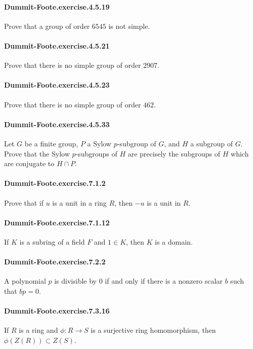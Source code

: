 \documentclass{article}
\begin{document}
\paragraph{Dummit-Foote.exercise.4.5.19} Prove that a group of order $6545$ is not simple.

\paragraph{Dummit-Foote.exercise.4.5.21} Prove that there is no simple group of order $2907$.

\paragraph{Dummit-Foote.exercise.4.5.23} Prove that there is no simple group of order $462$.

\paragraph{Dummit-Foote.exercise.4.5.33} Let $G$ be a finite group, $P$ a Sylow $p$-subgroup of $G$, and $H$ a subgroup of $G$. Prove that the Sylow $p$-subgroups of $H$ are precisely the subgroups of $H$ which are conjugate to $H\cap P$.

\paragraph{Dummit-Foote.exercise.7.1.2} Prove that if $u$ is a unit in a ring $R$, then $-u$ is a unit in $R$.

\paragraph{Dummit-Foote.exercise.7.1.12} If $K$ is a subring of a field $F$ and $1\in K$, then $K$ is a domain.

\paragraph{Dummit-Foote.exercise.7.2.2} A polynomial $p$ is divisible by $0$ if and only if there is a nonzero scalar $b$ such that $bp=0$.

\paragraph{Dummit-Foote.exercise.7.3.16} If $R$ is a ring and $\phi:R\to S$ is a surjective ring homomorphism, then $\phi(Z(R))\subset Z(S)$.
\end{document}
